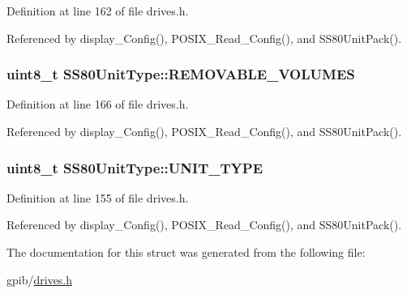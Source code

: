 Definition at line 162 of file drives.\+h.



Referenced by display\+\_\+\+Config(), P\+O\+S\+I\+X\+\_\+\+Read\+\_\+\+Config(), and S\+S80\+Unit\+Pack().

\subsubsection[{\texorpdfstring{R\+E\+M\+O\+V\+A\+B\+L\+E\+\_\+\+V\+O\+L\+U\+M\+ES}{REMOVABLE_VOLUMES}}]{\setlength{\rightskip}{0pt plus 5cm}uint8\+\_\+t S\+S80\+Unit\+Type\+::\+R\+E\+M\+O\+V\+A\+B\+L\+E\+\_\+\+V\+O\+L\+U\+M\+ES}\hypertarget{structSS80UnitType_a6dcef2939bd0a19951ad1592b1ec8c31}{}\label{structSS80UnitType_a6dcef2939bd0a19951ad1592b1ec8c31}


Definition at line 166 of file drives.\+h.



Referenced by display\+\_\+\+Config(), P\+O\+S\+I\+X\+\_\+\+Read\+\_\+\+Config(), and S\+S80\+Unit\+Pack().

\subsubsection[{\texorpdfstring{U\+N\+I\+T\+\_\+\+T\+Y\+PE}{UNIT_TYPE}}]{\setlength{\rightskip}{0pt plus 5cm}uint8\+\_\+t S\+S80\+Unit\+Type\+::\+U\+N\+I\+T\+\_\+\+T\+Y\+PE}\hypertarget{structSS80UnitType_ae00e42430682e849d83b1ca4c8f44013}{}\label{structSS80UnitType_ae00e42430682e849d83b1ca4c8f44013}


Definition at line 155 of file drives.\+h.



Referenced by display\+\_\+\+Config(), P\+O\+S\+I\+X\+\_\+\+Read\+\_\+\+Config(), and S\+S80\+Unit\+Pack().



The documentation for this struct was generated from the following file\+:\begin{DoxyCompactItemize}
\item 
gpib/\hyperlink{drives_8h}{drives.\+h}\end{DoxyCompactItemize}
